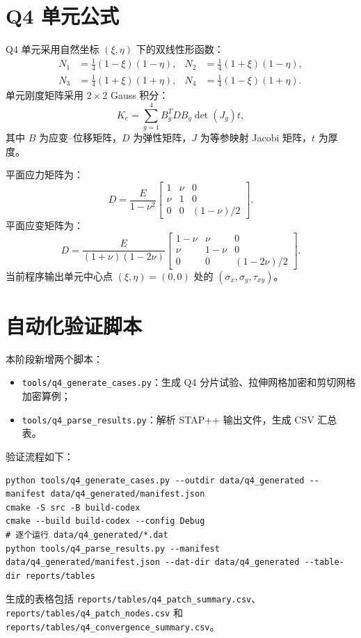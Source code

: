 ﻿\documentclass[UTF8,11pt,a4paper]{ctexart}
\begin{document}
\section{Q4 单元公式}
Q4 单元采用自然坐标 $(\xi,\eta)$ 下的双线性形函数：
\begin{align}
N_1 &= \frac{1}{4}(1-\xi)(1-\eta), &
N_2 &= \frac{1}{4}(1+\xi)(1-\eta),\\
N_3 &= \frac{1}{4}(1+\xi)(1+\eta), &
N_4 &= \frac{1}{4}(1-\xi)(1+\eta).
\end{align}
单元刚度矩阵采用 $2\times2$ Gauss 积分：
\begin{equation}
K_e = \sum_{g=1}^{4} B_g^T D B_g \det(J_g)t,
\end{equation}
其中 $B$ 为应变--位移矩阵，$D$ 为弹性矩阵，$J$ 为等参映射 Jacobi 矩阵，$t$ 为厚度。

平面应力矩阵为：
\begin{equation}
D = \frac{E}{1-\nu^2}
\begin{bmatrix}
1 & \nu & 0\\
\nu & 1 & 0\\
0 & 0 & (1-\nu)/2
\end{bmatrix}.
\end{equation}
平面应变矩阵为：
\begin{equation}
D = \frac{E}{(1+\nu)(1-2\nu)}
\begin{bmatrix}
1-\nu & \nu & 0\\
\nu & 1-\nu & 0\\
0 & 0 & (1-2\nu)/2
\end{bmatrix}.
\end{equation}
当前程序输出单元中心点 $(\xi,\eta)=(0,0)$ 处的 $(\sigma_x,\sigma_y,\tau_{xy})$。

\section{自动化验证脚本}
本阶段新增两个脚本：
\begin{itemize}
  \item \texttt{tools/q4\_generate\_cases.py}：生成 Q4 分片试验、拉伸网格加密和剪切网格加密算例；
  \item \texttt{tools/q4\_parse\_results.py}：解析 STAP++ 输出文件，生成 CSV 汇总表。
\end{itemize}
验证流程如下：
\begin{lstlisting}
python tools/q4_generate_cases.py --outdir data/q4_generated --manifest data/q4_generated/manifest.json
cmake -S src -B build-codex
cmake --build build-codex --config Debug
# 逐个运行 data/q4_generated/*.dat
python tools/q4_parse_results.py --manifest data/q4_generated/manifest.json --dat-dir data/q4_generated --table-dir reports/tables
\end{lstlisting}
生成的表格包括 \texttt{reports/tables/q4\_patch\_summary.csv}、\texttt{reports/tables/q4\_patch\_nodes.csv} 和 \texttt{reports/tables/q4\_convergence\_summary.csv}。
\end{document}
